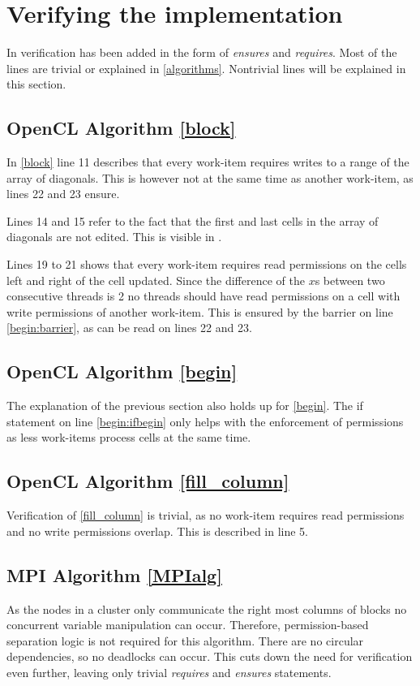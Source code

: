\section{Verifying the implementation} \label{q3}
In  verification has been added in the form of \textit{ensures} and \textit{requires}.
Most of the lines are trivial or explained in \cref{algorithms}.
Nontrivial lines will be explained in this section.

\subsection{OpenCL Algorithm \ref*{block}}
In \cref{block} line 11 describes that every work-item requires writes to a range of the array of diagonals.
This is however not at the same time as another work-item, as lines 22 and 23 ensure.

Lines 14 and 15 refer to the fact that the first and last cells in the array of diagonals are not edited.
This is visible in .

Lines 19 to 21 shows that every work-item requires read permissions on the cells left and right of the cell updated.
Since the difference of the $x$s between two consecutive threads is 2 no threads should have read permissions on a cell with write permissions of another work-item.
This is ensured by the barrier on line \ref{begin:barrier}, as can be read on lines 22 and 23.

\subsection{OpenCL Algorithm \ref*{begin}}
The explanation of the previous section also holds up for \cref{begin}.
The if statement on line \ref{begin:ifbegin} only helps with the enforcement of permissions as less work-items process cells at the same time.

\subsection{OpenCL Algorithm \ref*{fill_column}}
Verification of \cref{fill_column} is trivial, as no work-item requires read permissions and no write permissions overlap.
This is described in line 5.

\subsection{MPI Algorithm \ref*{MPIalg}}
As the nodes in a cluster only communicate the right most columns of blocks no concurrent variable manipulation can occur.
Therefore, permission-based separation logic is not required for this algorithm.
There are no circular dependencies, so no deadlocks can occur.
This cuts down the need for verification even further, leaving only trivial \textit{requires} and \textit{ensures} statements.

